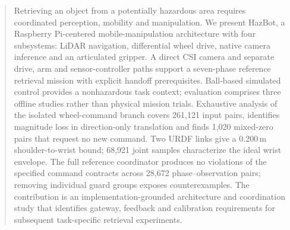 \begin{abstract}
Retrieving an object from a potentially hazardous area requires coordinated perception, mobility and manipulation. We present HazBot, a Raspberry Pi-centered mobile-manipulation architecture with four subsystems: LiDAR navigation, differential wheel drive, native camera inference and an articulated gripper. A direct CSI camera and separate drive, arm and sensor-controller paths support a seven-phase reference retrieval mission with explicit handoff prerequisites. Ball-based simulated control provides a nonhazardous task context; evaluation comprises three offline studies rather than physical mission trials. Exhaustive analysis of the isolated wheel-command branch covers 261,121 input pairs, identifies magnitude loss in direction-only translation and finds 1,020 mixed-zero pairs that request no new command. Two URDF links give a 0.200\,m shoulder-to-wrist bound; 68,921 joint samples characterize the ideal wrist envelope. The full reference coordinator produces no violations of the specified command contracts across 28,672 phase--observation pairs; removing individual guard groups exposes counterexamples. The contribution is an implementation-grounded architecture and coordination study that identifies gateway, feedback and calibration requirements for subsequent task-specific retrieval experiments.
\end{abstract}
